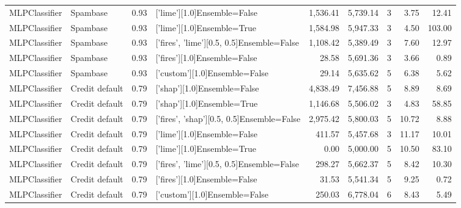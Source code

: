 \begin{tabular}{llrlrrlrr}
      MLPClassifier &       Spambase &      0.93 &               ['lime'][1.0]Ensemble=False &   1,536.41 &                 5,739.14 &               3 &               3.75 &  12.41 \\
      MLPClassifier &       Spambase &      0.93 &                ['lime'][1.0]Ensemble=True &   1,584.98 &                 5,947.33 &               3 &               4.50 & 103.00 \\
      MLPClassifier &       Spambase &      0.93 & ['fires', 'lime'][0.5, 0.5]Ensemble=False &   1,108.42 &                 5,389.49 &               3 &               7.60 &  12.97 \\
      MLPClassifier &       Spambase &      0.93 &              ['fires'][1.0]Ensemble=False &      28.58 &                 5,691.36 &               3 &               3.66 &   0.89 \\
      MLPClassifier &       Spambase &      0.93 &             ['custom'][1.0]Ensemble=False &      29.14 &                 5,635.62 &               5 &               6.38 &   5.62 \\
      MLPClassifier & Credit default &      0.79 &               ['shap'][1.0]Ensemble=False &   4,838.49 &                 7,456.88 &               5 &               8.89 &   8.69 \\
      MLPClassifier & Credit default &      0.79 &                ['shap'][1.0]Ensemble=True &   1,146.68 &                 5,506.02 &               3 &               4.83 &  58.85 \\
      MLPClassifier & Credit default &      0.79 & ['fires', 'shap'][0.5, 0.5]Ensemble=False &   2,975.42 &                 5,800.03 &               5 &              10.72 &   8.88 \\
      MLPClassifier & Credit default &      0.79 &               ['lime'][1.0]Ensemble=False &     411.57 &                 5,457.68 &               3 &              11.17 &  10.01 \\
      MLPClassifier & Credit default &      0.79 &                ['lime'][1.0]Ensemble=True &       0.00 &                 5,000.00 &               5 &              10.50 &  83.10 \\
      MLPClassifier & Credit default &      0.79 & ['fires', 'lime'][0.5, 0.5]Ensemble=False &     298.27 &                 5,662.37 &               5 &               8.42 &  10.30 \\
      MLPClassifier & Credit default &      0.79 &              ['fires'][1.0]Ensemble=False &      31.53 &                 5,541.34 &               5 &               9.25 &   0.72 \\
      MLPClassifier & Credit default &      0.79 &             ['custom'][1.0]Ensemble=False &     250.03 &                 6,778.04 &               6 &               8.43 &   5.49 \\
\bottomrule
\end{tabular}
